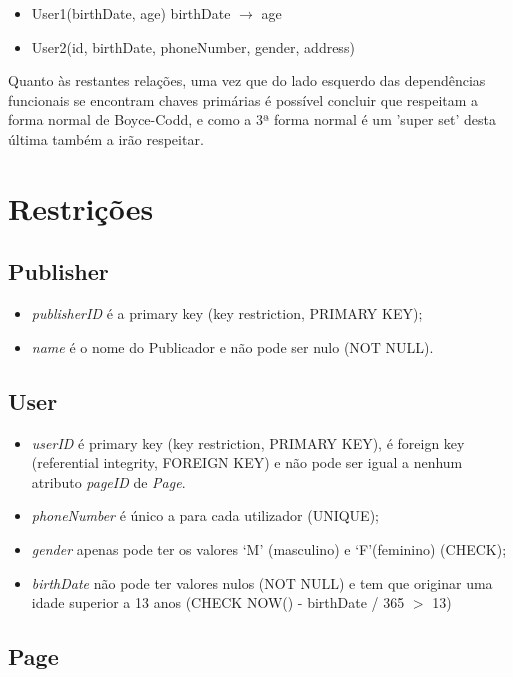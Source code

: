 \documentclass[12pt]{report}
\begin{document}
\begin{itemize}
    \item User1(birthDate, age)
    birthDate $\rightarrow$ age
    \item User2(id, birthDate, phoneNumber, gender, address)
\end{itemize}

Quanto às restantes relações, uma vez que do lado esquerdo das dependências funcionais se encontram chaves primárias é possível concluir que respeitam a forma normal de Boyce-Codd, e como a 3ª forma normal é um 'super set' desta última também a irão respeitar.

\chapter{Restrições}

\section{Publisher}

\begin{itemize}
    \item \textit{publisherID} é a primary key (key restriction, PRIMARY KEY);
    \item \textit{name} é o nome do Publicador e não pode ser nulo (NOT NULL).
\end{itemize}

\section{User}

\begin{itemize}
    \item \textit{userID} é primary key (key restriction, PRIMARY KEY), é foreign key (referential integrity, FOREIGN KEY) e não pode ser igual a nenhum atributo \textit{pageID} de \textit{Page}.
    \item \textit{phoneNumber} é único a para cada utilizador (UNIQUE);
    \item \textit{gender} apenas pode ter os valores ‘M’ (masculino) e ‘F’(feminino) (CHECK);
    \item \textit{birthDate} não pode ter valores nulos (NOT NULL) e tem que originar uma idade superior a 13 anos (CHECK NOW() - birthDate / 365 $>$ 13)
\end{itemize}

\section{Page}
\end{document}
